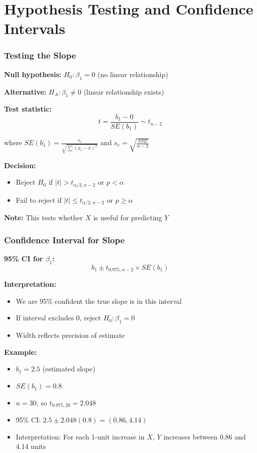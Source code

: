 \documentclass{beamer}
\begin{document}
\section{Hypothesis Testing and Confidence Intervals}

\begin{frame}
\frametitle{Testing the Slope}
\textbf{Null hypothesis:} $H_0: \beta_1 = 0$ (no linear relationship)

\textbf{Alternative:} $H_A: \beta_1 \neq 0$ (linear relationship exists)

\vspace{0.5cm}
\textbf{Test statistic:}
$$t = \frac{b_1 - 0}{SE(b_1)} \sim t_{n-2}$$

where $SE(b_1) = \frac{s_e}{\sqrt{\sum(x_i - \bar{x})^2}}$ and $s_e = \sqrt{\frac{SSE}{n-2}}$

\vspace{0.5cm}
\textbf{Decision:}
\begin{itemize}
\item Reject $H_0$ if $|t| > t_{\alpha/2, n-2}$ or $p < \alpha$
\item Fail to reject if $|t| \leq t_{\alpha/2, n-2}$ or $p \geq \alpha$
\end{itemize}

\vspace{0.3cm}
\textbf{Note:} This tests whether $X$ is useful for predicting $Y$
\end{frame}

\begin{frame}
\frametitle{Confidence Interval for Slope}
\textbf{95\% CI for $\beta_1$:}
$$b_1 \pm t_{0.975, n-2} \times SE(b_1)$$

\vspace{0.5cm}
\textbf{Interpretation:}
\begin{itemize}
\item We are 95\% confident the true slope is in this interval
\item If interval excludes 0, reject $H_0: \beta_1 = 0$
\item Width reflects precision of estimate
\end{itemize}

\vspace{0.5cm}
\textbf{Example:}
\begin{itemize}
\item $b_1 = 2.5$ (estimated slope)
\item $SE(b_1) = 0.8$
\item $n = 30$, so $t_{0.975, 28} = 2.048$
\item 95\% CI: $2.5 \pm 2.048(0.8) = (0.86, 4.14)$
\item Interpretation: For each 1-unit increase in $X$, $Y$ increases between 0.86 and 4.14 units
\end{itemize}
\end{frame}
\end{document}
